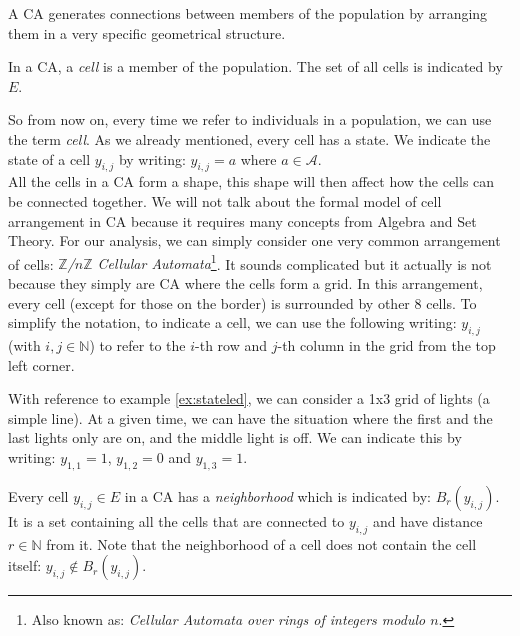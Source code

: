 A CA generates connections between members of the population by arranging them in a very specific
geometrical structure.

\begin{definition}[Cell]
\label{def:cell}
In a CA, a \textit{cell} is a member of the population. The set of all cells is indicated by $E$.
\end{definition}

So from now on, every time we refer to individuals in a population, we can use the term \textit{cell}.
As we already mentioned, every cell has a state. We indicate the state of a cell
$y_{i,j}$ by writing: $y_{i,j} = a$ where $a \in \mathcal{A}$.\\

All the cells in a CA form a shape, this shape will then affect how the cells can be connected together.
We will not talk about the formal model of cell arrangement in CA because it requires many concepts from
Algebra and Set Theory. For our analysis, we can simply consider one very common arrangement of cells:
\textit{$\mathbb{Z}$/$n\mathbb{Z}$ Cellular Automata}\footnote{Also known as: 
\textit{Cellular Automata over rings of integers modulo $n$}.}. It sounds complicated but it actually
is not because they simply are CA where the cells form a grid. In this arrangement, every cell 
(except for those on the border) is surrounded by other 8 cells.
To simplify the notation, to indicate a cell, we can use the following writing: $y_{i,j}$ (with
$i,j \in \mathbb{N}$) to refer to the $i$-th row and $j$-th column in the grid from the top left corner.

\begin{example}
\label{ex:stateled2}
With reference to example \ref{ex:stateled}, we can consider a 1x3 grid of lights (a simple line).
At a given time, we can have the situation where the first and the last lights only are on, and
the middle light is off. We can indicate this by writing: $y_{1,1}=1$, $y_{1,2}=0$ and $y_{1,3}=1$. 
\end{example}

\begin{definition}[Neighborhood]
\label{def:neigh}
Every cell $y_{i,j} \in E$ in a CA has a \textit{neighborhood} which is indicated by: 
$B_r\left( y_{i,j} \right)$. It is a set containing all the cells that are connected to
$y_{i,j}$ and have distance $r \in \mathbb{N}$ from it. Note that the neighborhood of a cell does
not contain the cell itself: $y_{i,j} \not\in B_r\left( y_{i,j} \right)$.
\end{definition}

